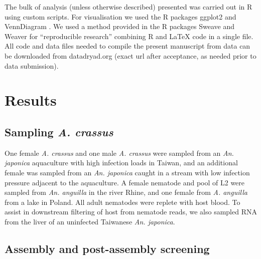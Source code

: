 \documentclass[10pt]{bmc_article}
\newenvironment{bmcformat}{\begin{raggedright}\baselineskip20pt\sloppy\setboolean{publ}{false}}{\end{raggedright}\baselineskip20pt\sloppy}
\begin{document}
\begin{bmcformat}
The bulk of analysis (unless otherwise described) presented was
carried out in R \cite{R_project} using custom scripts. For
visualisation we used the R packages ggplot2 \cite{ggplot-book} and
VennDiagram \cite{pmid21269502}. We used a method provided in the
R packages Sweave \cite{lmucs-papers:Leisch:2002} and Weaver
\cite{weaver} for ``reproducible research'' combining R and \LaTeX
code in a single file. All code and data files needed to compile the
present manuscript from data can be downloaded from datadryad.org
(exact url after acceptance, as needed prior to data submission).

\section*{Results}


\subsection*{Sampling \textit{A. crassus}}


One female \textit{A. crassus} and one male \textit{A. crassus} were
sampled from an \textit{An. japonica} aquaculture with high infection
loads in Taiwan, and an additional female was sampled from an
\textit{An. japonica} caught in a stream with low infection pressure
adjacent to the aquaculture. A female nematode and pool of L2 were
sampled from \textit{An. anguilla} in the river Rhine, and one female
from \textit{A. anguilla} from a lake in Poland. All adult nematodes
were replete with host blood. To assist in downstream filtering of
host from nematode reads, we also sampled RNA from the liver of an
uninfected Taiwanese \textit{An. japonica}.







\subsection*{Assembly and post-assembly screening}



\end{bmcformat}
\end{document}
